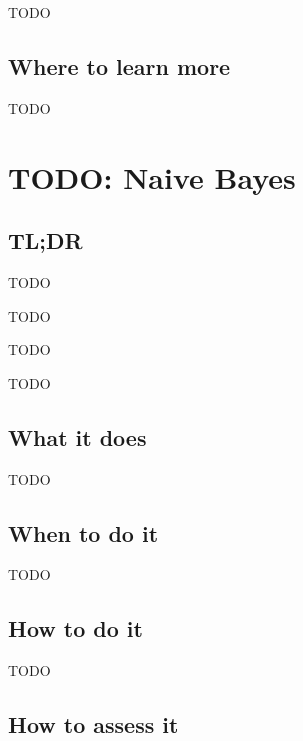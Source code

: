 \documentclass[
]{book}
\providecommand{\tightlist}{%
  \setlength{\itemsep}{0pt}\setlength{\parskip}{0pt}}
\begin{document}
TODO

\hypertarget{where-to-learn-more-5}{%
\section{Where to learn more}\label{where-to-learn-more-5}}

TODO

\hypertarget{naive-bayes}{%
\chapter{TODO: Naive Bayes}\label{naive-bayes}}

\hypertarget{tldr-6}{%
\section{TL;DR}\label{tldr-6}}

\begin{description}
\tightlist
\item[What it does]
TODO
\item[When to do it]
TODO
\item[How to do it]
TODO
\item[How to assess it]
TODO
\end{description}

\hypertarget{what-it-does-6}{%
\section{What it does}\label{what-it-does-6}}

TODO

\hypertarget{when-to-do-it-6}{%
\section{When to do it}\label{when-to-do-it-6}}

TODO

\hypertarget{how-to-do-it-6}{%
\section{How to do it}\label{how-to-do-it-6}}

TODO

\hypertarget{how-to-assess-it-6}{%
\section{How to assess it}\label{how-to-assess-it-6}}
\end{document}
